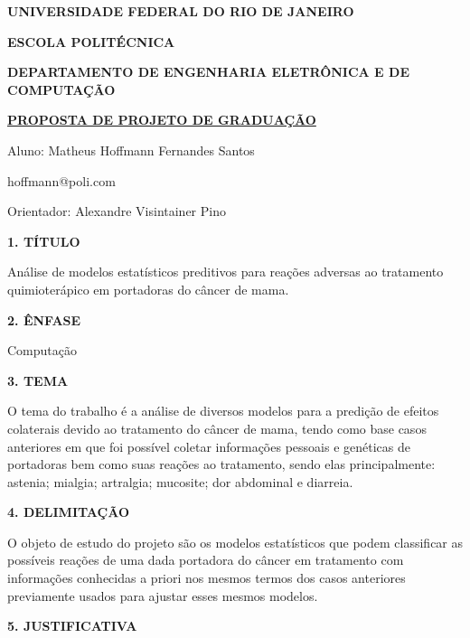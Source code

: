 \documentclass[a4paper,12pt,oneside,openany]{report}
\begin{document}
\begin{center}
\textbf{UNIVERSIDADE FEDERAL DO RIO DE JANEIRO}
\vspace{-0.2cm}

\textbf{ESCOLA POLIT\'ECNICA}
\vspace{-0.2cm}

\textbf{DEPARTAMENTO DE ENGENHARIA ELETR\^ONICA E DE COMPUTA\c{C}ÃO}
\vspace{0.8cm}

\underline{\textbf{PROPOSTA DE PROJETO DE GRADUA\c{C}ÃO}}

Aluno: Matheus Hoffmann Fernandes Santos
\vspace{-0.2cm}

hoffmann@poli.com

Orientador: Alexandre Visintainer Pino
\end{center}

\textbf{1. T\'ITULO}

An\'alise de modelos estat\'isticos preditivos para rea\c{c}\~oes adversas ao tratamento quimioter\'apico em portadoras do c\^ancer de mama.

\vspace{0.4cm}
\textbf{2. \^ENFASE}

Computa\c{c}\~ao

\vspace{0.4cm}
\textbf{3. TEMA}

O tema do trabalho \'e a an\'alise de diversos modelos para a predi\c{c}\~ao de efeitos colaterais devido ao tratamento do c\^ancer de mama, tendo como base casos anteriores em que foi poss\'ivel coletar informa\c{c}\~oes pessoais e gen\'eticas de portadoras bem como suas rea\c{c}\~oes ao tratamento, sendo elas principalmente: astenia; mialgia; artralgia; mucosite; dor abdominal e diarreia. 

\vspace{0.4cm}
\textbf{4. DELIMITA\c{C}ÃO}

O objeto de estudo do projeto s\~ao os modelos estat\'isticos que podem classificar as poss\'iveis rea\c{c}\~oes de uma dada portadora do c\^ancer em tratamento com informa\c{c}\~oes conhecidas a priori nos mesmos termos dos casos anteriores previamente usados para ajustar esses mesmos modelos.

\vspace{0.4cm}
\textbf{5. JUSTIFICATIVA}
\end{document}
